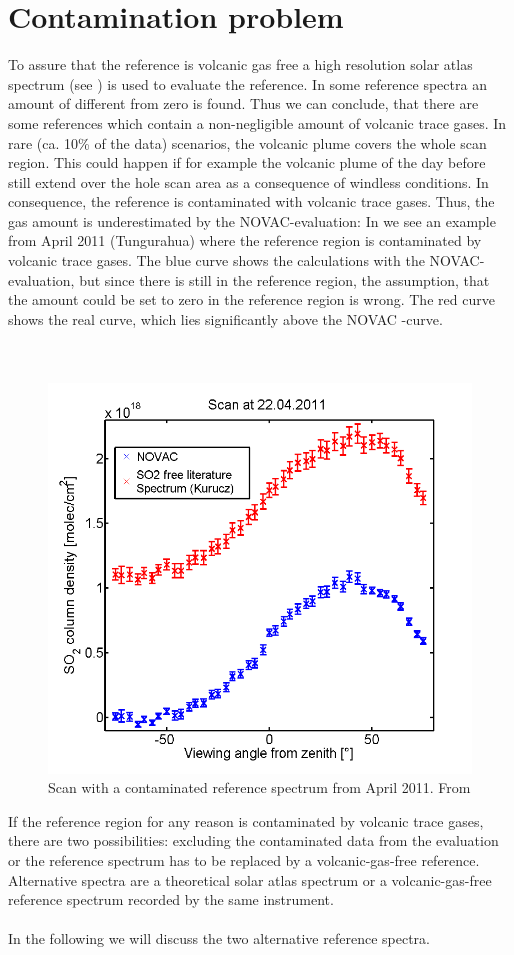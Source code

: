 \section{Contamination problem\label{Chap:Cont}}
To assure that the reference is volcanic gas free a high resolution solar atlas spectrum (see ) is used to evaluate the reference. In some reference spectra an amount of   different from zero is found. Thus we can conclude, that there are some references which contain a non-negligible amount of volcanic trace gases.
In rare (ca. 10\% of the data) scenarios, the
volcanic plume covers the whole scan region.
This could happen if for example the volcanic plume of the day before still extend over the hole scan area as a consequence of windless conditions.
In consequence, the reference	is contaminated with volcanic trace gases. Thus, the gas amount is underestimated by the NOVAC-evaluation: In  we see an example from April 2011 (Tungurahua) where the reference region is contaminated by volcanic trace gases. The blue  curve shows the calculations with the NOVAC-evaluation, but since there is still  in the reference region, the assumption, that the  amount could be set to zero in the reference region is wrong. The red curve shows the real  curve, which lies significantly above the NOVAC -curve.\\
\\	
%
\\
\begin{figure}
	\centering
	\includegraphics[width=0.7\linewidth]{Bilder/contaminated}
	\caption{Scan with a contaminated reference spectrum from April 2011. From \cite{WarnachSimon}}
	\label{fig:contaminated}
\end{figure}
If the reference region for any reason is
contaminated by volcanic trace gases, there are two possibilities: excluding the contaminated data from the evaluation or the reference spectrum has to be
replaced by a volcanic-gas-free reference. Alternative spectra are a
theoretical solar atlas spectrum or a volcanic-gas-free reference
spectrum recorded by the same instrument.\\ 
%
\\
%
In the following we will discuss the two alternative reference spectra.
%
